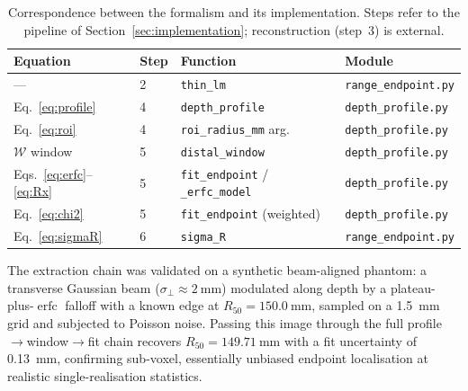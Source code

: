 \documentclass[11pt]{article}
\begin{document}
\begin{table}[htb]
  \centering
  \caption{Correspondence between the formalism and its implementation. Steps
  refer to the pipeline of Section~\ref{sec:implementation}; reconstruction
  (step~3) is external.}
  \label{tab:codemap}
  \begin{tabular}{@{}llll@{}}
    \toprule
    Equation & Step & Function & Module \\
    \midrule
    ---                       & 2 & \texttt{thin\_lm}      & \texttt{range\_endpoint.py} \\
    Eq.~\eqref{eq:profile}    & 4 & \texttt{depth\_profile}& \texttt{depth\_profile.py} \\
    Eq.~\eqref{eq:roi}        & 4 & \texttt{roi\_radius\_mm} arg. & \texttt{depth\_profile.py} \\
    \(\mathcal{W}\) window     & 5 & \texttt{distal\_window}& \texttt{depth\_profile.py} \\
    Eqs.~\eqref{eq:erfc}--\eqref{eq:Rx} & 5 & \texttt{fit\_endpoint} / \texttt{\_erfc\_model} & \texttt{depth\_profile.py} \\
    Eq.~\eqref{eq:chi2}       & 5 & \texttt{fit\_endpoint} (weighted) & \texttt{depth\_profile.py} \\
    Eq.~\eqref{eq:sigmaR}     & 6 & \texttt{sigma\_R}      & \texttt{range\_endpoint.py} \\
    \bottomrule
  \end{tabular}
\end{table}

The extraction chain was validated on a synthetic beam-aligned phantom: a
transverse Gaussian beam (\(\sigma_\perp\approx\SI{2}{\milli\metre}\)) modulated
along depth by a plateau-plus-\(\operatorname{erfc}\) falloff with a known edge at
\(R_{50}=\SI{150.0}{\milli\metre}\), sampled on a \SI{1.5}{\milli\metre} grid and
subjected to Poisson noise. Passing this image through the full
profile\(\rightarrow\)window\(\rightarrow\)fit chain recovers
\(R_{50}=\SI{149.71}{\milli\metre}\) with a fit uncertainty of
\SI{0.13}{\milli\metre}, confirming sub-voxel, essentially unbiased endpoint
localisation at realistic single-realisation statistics.
\end{document}

